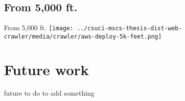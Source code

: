\documentclass[9pt]{beamer}
\begin{document}

\subsection{From 5,000 ft.}
\begin{frame}{From 5,000 ft.}
  \centering
  \texttt{[image: ../csuci-mscs-thesis-dist-web-crawler/media/crawler/aws-deploy-5k-feet.png]}
\end{frame}


\section[Future]{Future work}
\begin{frame}[plain]
\end{frame}


\begin{frame}{future to do}
  to add something
\end{frame}


%  


\begin{frame}[plain]
\end{frame}
\end{document}
